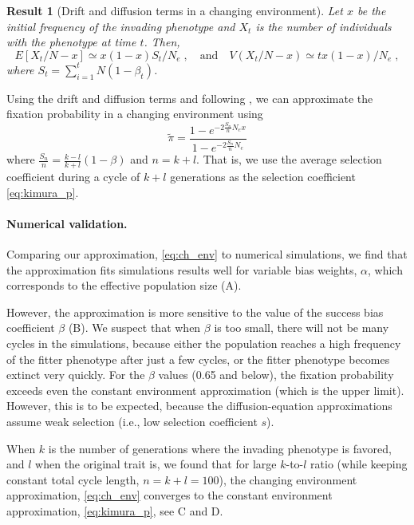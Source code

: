 \documentclass[12pt]{extarticle}
\newtheorem{result}{Result}
\begin{document}
\begin{result} [Drift and diffusion terms in a changing environment]\label{res:ch_expected}
Let $x$ be the initial frequency of the invading phenotype and $X_t$ is the number of individuals with the phenotype at time $t$.
Then,
\begin{equation}\label{eq:ch_expected_and_var}
E[X_t/N - x] \simeq x(1-x) S_t / N_e \;, 
\quad
\text{and}
\quad
V(X_t/N-x) \simeq  t x(1-x) / N_e \;,
\end{equation}
where $S_t=\sum\limits_{i=1}^{t} N (1-\beta_t)$.
\end{result}

Using the drift and diffusion terms and following \citet{changeEnv}, we can approximate the fixation probability in a changing environment using
\begin{equation}\label{eq:ch_env}
\tilde\pi = \frac{1-e^{-2 \frac{S_n}{n} N_e x}}{1-e^{-2 \frac{S_n}{n} N_e}}
\end{equation}
where $\frac{S_n}{n} = \frac{k-l}{k+l}(1-\beta)$ and $n=k+l$.
That is, we use the average selection coefficient during a cycle of $k+l$ generations as the selection coefficient \cref{eq:kimura_p}.

\paragraph{Numerical validation.}
Comparing our approximation, \cref{eq:ch_env} to numerical simulations, we find that the approximation fits simulations results well for variable bias weights, $\alpha$, which corresponds to the effective population size (A).

However, the approximation is more sensitive to the value of the success bias coefficient $\beta$ (B).
We suspect that when $\beta$ is too small, there will not be many cycles in the simulations, because either the population reaches a high frequency of the fitter phenotype after just a few cycles, or the fitter phenotype becomes extinct very quickly. 
For the $\beta$ values (0.65 and below), the fixation probability exceeds even the constant environment approximation (which is the upper limit). However, this is to be expected, because the diffusion-equation approximations assume weak selection (i.e., low selection coefficient $s$).


When $k$ is the number of generations where the invading phenotype is favored, and $l$ when the original trait is, we found that for large $k$-to-$l$ ratio (while keeping constant total cycle length, $n=k+l=100$), the changing environment approximation, \cref{eq:ch_env} converges to the constant environment approximation, \cref{eq:kimura_p}, see C and D.
\end{document}
